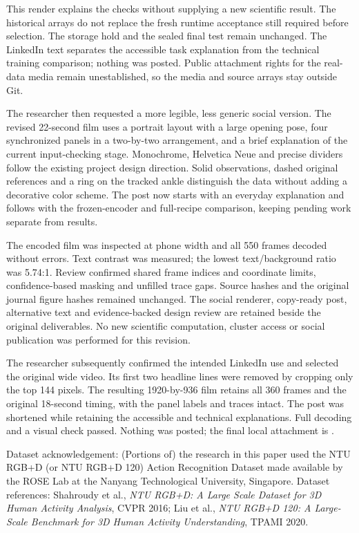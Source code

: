 This render explains the checks without supplying a new scientific result.
The historical arrays do not replace the fresh runtime acceptance still
required before selection. The storage hold and the sealed final test remain
unchanged. The LinkedIn text separates the accessible task explanation from
the technical training comparison; nothing was posted. Public attachment
rights for the real-data media remain unestablished, so the media and source
arrays stay outside Git.

The researcher then requested a more legible, less generic social version.
The revised 22-second film uses a portrait layout with a large opening pose,
four synchronized panels in a two-by-two arrangement, and a brief explanation
of the current input-checking stage. Monochrome, Helvetica Neue and precise
dividers follow the existing project design direction. Solid observations,
dashed original references and a ring on the tracked ankle distinguish the
data without adding a decorative color scheme. The post now starts with an
everyday explanation and follows with the frozen-encoder and full-recipe
comparison, keeping pending work separate from results.

The encoded film was inspected at phone width and all 550 frames decoded
without errors. Text contrast was measured; the lowest text/background ratio
was 5.74:1. Review confirmed shared frame indices and coordinate limits,
confidence-based masking and unfilled trace gaps. Source hashes and the
original journal figure hashes remained unchanged. The social renderer,
copy-ready post, alternative text and evidence-backed design review are
retained beside the original deliverables. No new scientific computation,
cluster access or social publication was performed for this revision.

The researcher subsequently confirmed the intended LinkedIn use and selected
the original wide video. Its first two headline lines were removed by cropping
only the top 144 pixels. The resulting 1920-by-936 film retains all 360 frames
and the original 18-second timing, with the panel labels and traces intact.
The post was shortened while retaining the accessible and technical
explanations. Full decoding and a visual check passed. Nothing was posted;
the final local attachment is .


\begingroup\small
Dataset acknowledgement: (Portions of) the research in this paper used the
NTU RGB+D (or NTU RGB+D 120) Action Recognition Dataset made available by the
ROSE Lab at the Nanyang Technological University, Singapore.
Dataset references: Shahroudy et al., \emph{NTU RGB+D: A Large Scale Dataset
for 3D Human Activity Analysis}, CVPR 2016; Liu et al., \emph{NTU RGB+D 120:
A Large-Scale Benchmark for 3D Human Activity Understanding}, TPAMI 2020.
\endgroup
